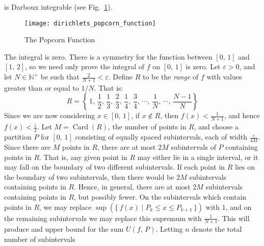 \documentclass{article}
\theoremstyle{normal}
\newif\ifsolution
\begin{document}
        is Darboux integrable (see Fig.~\ref{fig:dirichlets_popcorn_function}).
        \begin{figure}
            \centering
            \texttt{[image: dirichlets\_popcorn\_function]}
            \caption{The Popcorn Function}
            \label{fig:dirichlets_popcorn_function}
        \end{figure}
        \ifsolution
            \color{blue}
            \par\hfill\par
            The integral is zero. There is a symmetry for the function between
            $[0,\,1]$ and $[1,\,2]$, so we need only prove the integral
            of $f$ on $[0,\,1]$ is zero. Let $\varepsilon>0$, and let
            $N\in\mathbb{N}^{+}$ be such that $\frac{2}{N+1}<\varepsilon$.
            Define $R$ to be the \textit{range} of $f$ with values greater
            than or equal to $1/N$. That is:
            \begin{equation}
                R=
                \left\{
                    \,
                    1,\,\frac{1}{2},\,\frac{1}{3},\,\frac{2}{3},\,
                    \frac{1}{4},\,\frac{3}{4},\,\cdots,\,
                    \frac{1}{N},\,\cdots,\,\frac{N-1}{N}
                \right\}
            \end{equation}
            Since we are now considering $x\in[0,\,1]$, if $x\not\in{R}$,
            then $f(x)<\frac{1}{N+1}$, and hence $f(x)<\frac{\varepsilon}{2}$.
            Let $M=\operatorname{Card}(R)$, the number of points in $R$,
            and choose a partition
            $P$ for $[0,\,1]$ consisting of equally spaced subintervals, each
            of width $\frac{\varepsilon}{4M}$. Since there are $M$ points in
            $R$, there are at most $2M$ subintervals of $P$ containing points
            in $R$. That is, any given point in $R$ may either lie in a single
            interval, or it may fall on the boundary of two different
            subintervals. If each point in $R$ lies on the boundary of two
            subintervals, then there would be $2M$ subintervals containing
            points in $R$. Hence, in general, there are at most $2M$
            subintervals containing points in $R$, but possibly fewer.
            On the subintervals which contain points in $R$, we may replace
            $\sup(\{\,f(x)\;|\;P_{k}\leq{x}\leq{P}_{k+1}\,\})$ with $1$, and on
            the remaining subintervals we may replace this supremum with
            $\frac{1}{N+1}$. This will produce and upper bound for the sum
            $U(f,\,P)$. Letting $n$ denote the total number of subintervals
\end{document}
